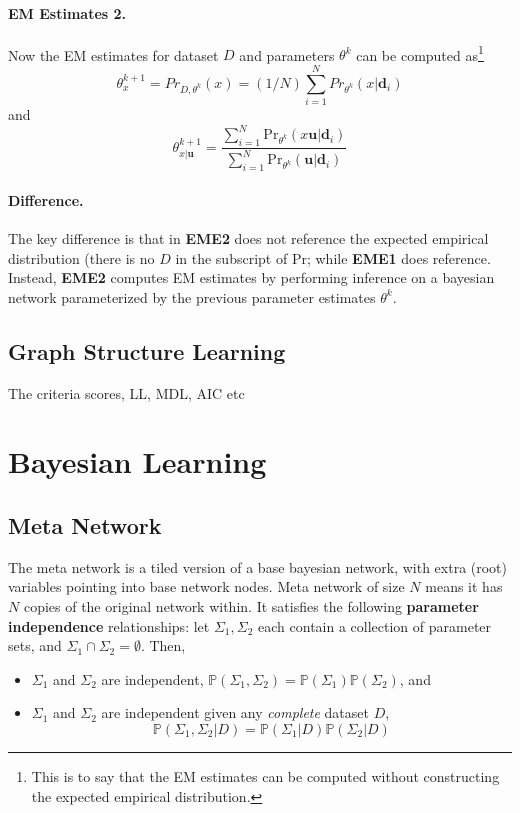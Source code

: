 \documentclass[11pt]{article}
\newcommand{\bd}{\mathbf{d}}
\newcommand{\bu}{\mathbf{u}}
\newcommand{\pr}{\mathrm{Pr}}
\begin{document}
\paragraph{EM Estimates 2.} Now the EM estimates for dataset $D$ and parameters $\theta^k$ can be computed as\footnote{This is to say that the EM estimates can be computed without constructing the expected empirical distribution.}
\begin{equation}
	\theta_{x} ^{k + 1} = Pr_{D, \theta^k} (x) = (1/N) \sum_{i = 1}^N Pr_{\theta^k} (x | \bd_i)
\end{equation}
and
\begin{equation}
	\theta_{x|\bu}^{k + 1} = \frac{\sum_{i= 1}^N \pr_{\theta^k} (x\bu | \bd_i)}{\sum_{i = 1}^N \pr_{\theta^k} (\bu | \bd_i)}
\end{equation}

\paragraph{Difference.} The key difference is that in \textbf{EME2} does not reference the expected empirical distribution (there is no $D$ in the subscript of $\pr$; while \textbf{EME1} does reference. Instead, \textbf{EME2} computes EM estimates by performing inference on a bayesian network parameterized by the previous parameter estimates $\theta^k$.  

\subsection{Graph Structure Learning}
The criteria scores, LL, MDL, AIC etc

\section{Bayesian Learning}
\subsection{Meta Network}
The meta network is a tiled version of a base bayesian network, with extra (root) variables pointing into base network nodes. Meta network of size $N$ means it has $N$ copies of the original network within. It satisfies the following \textbf{parameter independence} relationships: let $\Sigma_1, \Sigma_2$ each contain a collection of parameter sets, and $\Sigma_1 \cap \Sigma_2 = \emptyset$. Then, 
\begin{itemize}
	\item $\Sigma_1$ and $\Sigma_2$ are independent, $\mathbb P (\Sigma_1, \Sigma_2) = \mathbb P (\Sigma_1 ) \mathbb P (\Sigma_2) $, and
	\item $\Sigma_1$ and $\Sigma_2$ are independent given any \textit{complete} dataset $D$, 
	\begin{equation}
		\mathbb P (\Sigma_1, \Sigma_2 | D) = \mathbb P (\Sigma_1 |D) \mathbb P (\Sigma_2 |D) 
	\end{equation}
\end{itemize}
\end{document}
